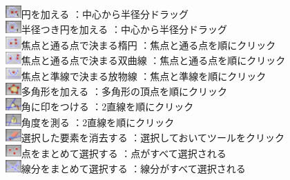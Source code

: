 \documentclass[papersize,a4paper,12pt,uplatex]{jsarticle}
\begin{document}
\begin{tabbing}
\includegraphics[bb=0 0 6.48 5.04 , width=0.6cm]{Fig/multi-add-circle.pdf}円を加える \>：中心から半径分ドラッグ\\
\includegraphics[bb=0 0 6.48 5.04 , width=0.6cm]{Fig/circle-by-radius.pdf}半径つき円を加える \>：中心から半径分ドラッグ\\
\includegraphics[bb=0 0 6.48 5.04 , width=0.6cm]{Fig/ellipse-by-foci.pdf}焦点と通る点で決まる楕円 \>：焦点と通る点を順にクリック\\
\includegraphics[bb=0 0 6.48 5.04 , width=0.6cm]{Fig/hyperbola-by-foci.pdf}焦点と通る点で決まる双曲線 \>：焦点と通る点を順にクリック\\
\includegraphics[bb=0 0 6.48 5.04 , width=0.6cm]{Fig/parabola-by-foci.pdf}焦点と準線で決まる放物線 \>：焦点と準線を順にクリック\\
\includegraphics[bb=0 0 6.48 5.04 , width=0.6cm]{Fig/polygon.pdf}多角形を加える \>：多角形の頂点を順にクリック\\
\includegraphics[bb=0 0 6.48 5.04 , width=0.6cm]{Fig/angle-mark.pdf}角に印をつける \>：2直線を順にクリック\\
\includegraphics[bb=0 0 6.48 5.04 , width=0.6cm]{Fig/angle.pdf}角度を測る \>：2直線を順にクリック\\
\includegraphics[bb=0 0 6.48 5.04 , width=0.6cm]{Fig/delete.pdf}選択した要素を消去する \>：選択しておいてツールをクリック\\
\includegraphics[bb=0 0 6.48 5.04 , width=0.6cm]{Fig/select-points.pdf}点をまとめて選択する \>：点がすべて選択される\\
\includegraphics[bb=0 0 6.48 5.04 , width=0.6cm]{Fig/select-lines.pdf}線分をまとめて選択する \>：線分がすべて選択される\\
 \end{tabbing}
\end{document}
